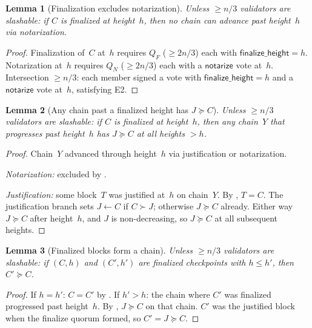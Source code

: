 \documentclass{article}
\newcommand{\notarize}{\mathsf{notarize}}
\theoremstyle{plain}
\newtheorem{lemma}{Lemma}
\theoremstyle{definition}
\theoremstyle{remark}
\begin{document}
\begin{lemma}[Finalization excludes notarization]\label{lem:finexclude-notarize}
Unless $\geq n/3$ validators are slashable: if $C$ is finalized at height~$h$, then no chain can advance past height~$h$ via notarization.
\end{lemma}

\begin{proof}
Finalization of~$C$ at~$h$ requires $Q_F$ ($\geq 2n/3$) each with $\mathsf{finalize\_height} = h$.
Notarization at~$h$ requires $Q_N$ ($\geq 2n/3$) each with a $\notarize$ vote at~$h$.
Intersection $\geq n/3$: each member signed a vote with $\mathsf{finalize\_height} = h$ and a $\notarize$ vote at~$h$, satisfying E2.
\end{proof}

\begin{lemma}[Any chain past a finalized height has $J \succeq C$]\label{lem:mainsafety}
Unless $\geq n/3$ validators are slashable: if $C$ is finalized at height~$h$, then any chain~$Y$ that progresses past height~$h$ has $J \succeq C$ at all heights $> h$.
\end{lemma}

\begin{proof}
Chain~$Y$ advanced through height~$h$ via justification or notarization.

\emph{Notarization:} excluded by .

\emph{Justification:} some block~$T$ was justified at~$h$ on chain~$Y$.
By , $T = C$.
The justification branch sets $J \gets C$ if $C \succ J$; otherwise $J \succeq C$ already.
Either way $J \succeq C$ after height~$h$, and $J$ is non-decreasing, so $J \succeq C$ at all subsequent heights.
\end{proof}

\begin{lemma}[Finalized blocks form a chain]\label{lem:finchain}
Unless $\geq n/3$ validators are slashable: if $(C, h)$ and $(C', h')$ are finalized checkpoints with $h \leq h'$, then $C' \succeq C$.
\end{lemma}

\begin{proof}
If $h = h'$: $C = C'$ by .
If $h' > h$: the chain where $C'$ was finalized progressed past height~$h$.
By , $J \succeq C$ on that chain.
$C'$ was the justified block when the finalize quorum formed, so $C' = J \succeq C$.
\end{proof}
\end{document}
